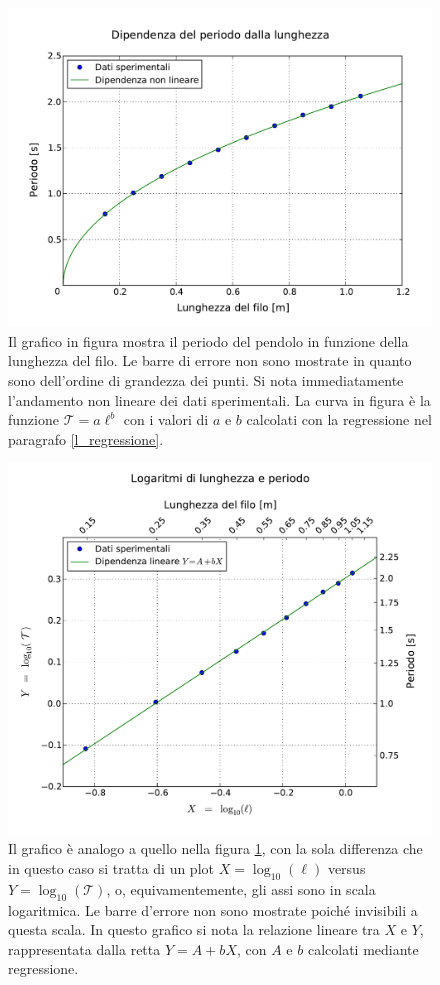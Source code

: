 \begin{figure}
    \centering
    \includegraphics[width=120mm]{immagini/lunghezza_periodo.pdf}
    \caption{Il grafico in figura mostra il periodo del pendolo in funzione della lunghezza del filo.
        Le barre di errore non sono mostrate in quanto sono dell'ordine di grandezza dei punti. Si
        nota immediatamente l'andamento non lineare dei dati sperimentali. La curva in
        figura è la funzione $\mathcal{T} = a\ell^b$ con i valori di $a$ e $b$ calcolati con la regressione
        nel paragrafo \ref{l_regressione}.}
    \label{fig:lunghezza_periodo}
\end{figure}

\begin{figure}
    \centering
    \includegraphics[width=120mm]{immagini/log.pdf}
    \caption{Il grafico è analogo a quello nella figura \ref{fig:lunghezza_periodo}, con la sola differenza
        che in questo caso si tratta di un plot $X = \log_{10} (\ell)$ versus $Y = \log_{10} (\mathcal{T})$, o, equivamentemente,
        gli assi sono in scala logaritmica. Le barre d'errore non sono mostrate poiché invisibili a questa scala.
        In questo grafico si nota la relazione lineare tra $X$ e $Y$, rappresentata dalla retta $Y = A + bX$, con $A$ e $b$ calcolati
        mediante regressione.}
    \label{fig:lunghezza_periodo_log}
\end{figure}

